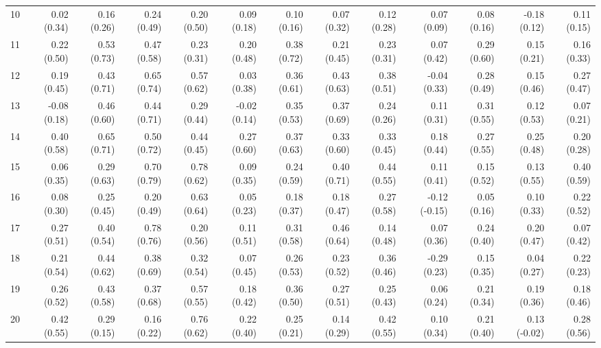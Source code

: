 \begin{sidewaystable}[ht]
\begin{center}
\begin{tabular}{rrrrr|rrrr|rrrr}
  10 & 0.02 (0.34) & 0.16 (0.26) & 0.24 (0.49) & 0.20 (0.50) & 0.09 (0.18) & 0.10 (0.16) & 0.07 (0.32) & 0.12 (0.28) & 0.07 (0.09) & 0.08 (0.16) & -0.18 (0.12) & 0.11 (0.15)  \\
  11 & 0.22 (0.50) & 0.53 (0.73) & 0.47 (0.58) & 0.23 (0.31) & 0.20 (0.48) & 0.38 (0.72) & 0.21 (0.45) & 0.23 (0.31) & 0.07 (0.42) & 0.29 (0.60) & 0.15 (0.21) & 0.16 (0.33)  \\
  12 & 0.19 (0.45) & 0.43 (0.71) & 0.65 (0.74) & 0.57 (0.62) & 0.03 (0.38) & 0.36 (0.61) & 0.43 (0.63) & 0.38 (0.51) & -0.04 (0.33) & 0.28 (0.49) & 0.15 (0.46) & 0.27 (0.47)  \\
  13 & -0.08 (0.18) & 0.46 (0.60) & 0.44 (0.71) & 0.29 (0.44) & -0.02 (0.14) & 0.35 (0.53) & 0.37 (0.69) & 0.24 (0.26) & 0.11 (0.31) & 0.31 (0.55) & 0.12 (0.53) & 0.07 (0.21)  \\
  14 & 0.40 (0.58) & 0.65 (0.71) & 0.50 (0.72) & 0.44 (0.45) & 0.27 (0.60) & 0.37 (0.63) & 0.33 (0.60) & 0.33 (0.45) & 0.18 (0.44) & 0.27 (0.55) & 0.25 (0.48) & 0.20 (0.28)  \\
  15 & 0.06 (0.35) & 0.29 (0.63) & 0.70 (0.79) & 0.78 (0.62) & 0.09 (0.35) & 0.24 (0.59) & 0.40 (0.71) & 0.44 (0.55) & 0.11 (0.41) & 0.15 (0.52) & 0.13 (0.55) & 0.40 (0.59)  \\
  16 & 0.08 (0.30) & 0.25 (0.45) & 0.20 (0.49) & 0.63 (0.64) & 0.05 (0.23) & 0.18 (0.37) & 0.18 (0.47) & 0.27 (0.58) & -0.12 (-0.15) & 0.05 (0.16) & 0.10 (0.33) & 0.22 (0.52)  \\
  17 & 0.27 (0.51) & 0.40 (0.54) & 0.78 (0.76) & 0.20 (0.56) & 0.11 (0.51) & 0.31 (0.58) & 0.46 (0.64) & 0.14 (0.48) & 0.07 (0.36) & 0.24 (0.40) & 0.20 (0.47) & 0.07 (0.42)  \\
  18 & 0.21 (0.54) & 0.44 (0.62) & 0.38 (0.69) & 0.32 (0.54) & 0.07 (0.45) & 0.26 (0.53) & 0.23 (0.52) & 0.36 (0.46) & -0.29 (0.23) & 0.15 (0.35) & 0.04 (0.27) & 0.22 (0.23)  \\
  19 & 0.26 (0.52) & 0.43 (0.58) & 0.37 (0.68) & 0.57 (0.55) & 0.18 (0.42) & 0.36 (0.50) & 0.27 (0.51) & 0.25 (0.43) & 0.06 (0.24) & 0.21 (0.34) & 0.19 (0.36) & 0.18 (0.46)  \\
  20 & 0.42 (0.55) & 0.29 (0.15) & 0.16 (0.22) & 0.76 (0.62) & 0.22 (0.40) & 0.25 (0.21) & 0.14 (0.29) & 0.42 (0.55) & 0.10 (0.34) & 0.21 (0.40) & 0.13 (-0.02) & 0.28 (0.56) \\
   \bottomrule
\end{tabular}
\end{center}
\end{sidewaystable}